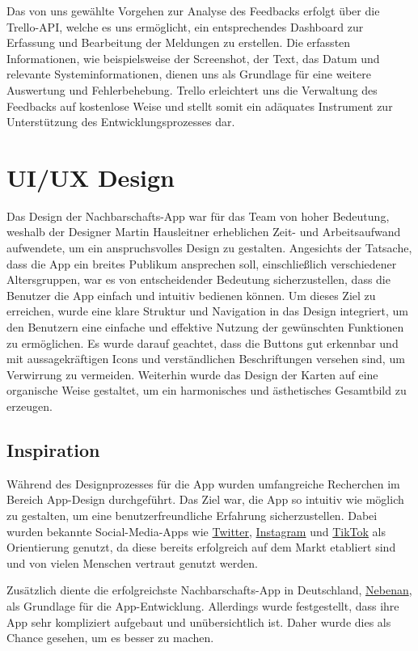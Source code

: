 Das von uns gewählte Vorgehen zur Analyse des Feedbacks erfolgt über die Trello-API, welche es uns ermöglicht, ein entsprechendes Dashboard zur Erfassung und Bearbeitung der Meldungen zu erstellen. Die erfassten Informationen, wie beispielsweise der Screenshot, der Text, das Datum und relevante Systeminformationen, dienen uns als Grundlage für eine weitere Auswertung und Fehlerbehebung. Trello erleichtert uns die Verwaltung des Feedbacks auf kostenlose Weise und stellt somit ein adäquates Instrument zur Unterstützung des Entwicklungsprozesses dar.


\section{UI/UX Design}
Das Design der Nachbarschafts-App war für das Team von hoher Bedeutung, weshalb der Designer Martin Hausleitner erheblichen Zeit- und Arbeitsaufwand aufwendete, um ein anspruchsvolles Design zu gestalten. Angesichts der Tatsache, dass die App ein breites Publikum ansprechen soll, einschließlich verschiedener Altersgruppen, war es von entscheidender Bedeutung sicherzustellen, dass die Benutzer die App einfach und intuitiv bedienen können. Um dieses Ziel zu erreichen, wurde eine klare Struktur und Navigation in das Design integriert, um den Benutzern eine einfache und effektive Nutzung der gewünschten Funktionen zu ermöglichen. Es wurde darauf geachtet, dass die Buttons gut erkennbar und mit aussagekräftigen Icons und verständlichen Beschriftungen versehen sind, um Verwirrung zu vermeiden. Weiterhin wurde das Design der Karten auf eine organische Weise gestaltet, um ein harmonisches und ästhetisches Gesamtbild zu erzeugen.
\subsection{Inspiration}
Während des Designprozesses für die App wurden umfangreiche Recherchen im Bereich App-Design durchgeführt. Das Ziel war, die App so intuitiv wie möglich zu gestalten, um eine benutzerfreundliche Erfahrung sicherzustellen. Dabei wurden bekannte Social-Media-Apps wie \href{https://twitter.com/}{Twitter}, \href{https://www.instagram.com/}{Instagram} und \href{https://www.tiktok.com/}{TikTok} als Orientierung genutzt, da diese bereits erfolgreich auf dem Markt etabliert sind und von vielen Menschen vertraut genutzt werden.

Zusätzlich diente die erfolgreichste Nachbarschafts-App in Deutschland, \href{https://nebenan.de/}{Nebenan}, als Grundlage für die App-Entwicklung. Allerdings wurde festgestellt, dass ihre App sehr kompliziert aufgebaut und unübersichtlich ist. Daher wurde dies als Chance gesehen, um es besser zu machen.


